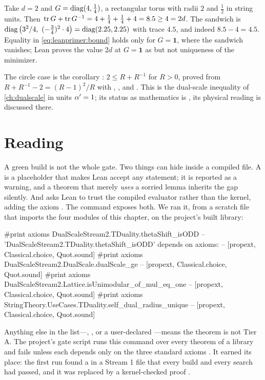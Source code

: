 \begin{example}[Numbers]\label{ex:leanprimer:numbers}
Take $d=2$ and $G=\operatorname{diag}(4,\tfrac14)$, a rectangular torus with radii $2$ and $\tfrac12$ in
string units. Then $\operatorname{tr} G+\operatorname{tr} G^{-1} = 4+\tfrac14+\tfrac14+4 = 8.5\ge4=2d$. The sandwich
is $\diag\big(3^2/4,\ (-\tfrac34)^2\cdot4\big)=\diag(2.25,2.25)$ with trace $4.5$, and
indeed $8.5-4=4.5$. Equality in \eqref{eq:leanprimer:bound} holds only for $G=\mathbf 1$,
where the sandwich vanishes; Lean proves the value $2d$ at $G=\mathbf 1$ as
 but not uniqueness of the minimizer.
\end{example}

The circle case is the corollary :
$2\le R+R^{-1}$ for $R>0$, proved from $R+R^{-1}-2=(R-1)^2/R$ with ,
,  and . This is the dual-scale inequality of
\cref{ch:dualscale} in units $\alpha'=1$; its status as mathematics is \TA, its physical
reading is discussed there.

\section{Reading }\label{sec:leanprimer:axioms}

A green build is not the whole gate. Two things can hide inside a compiled file. A
 is a
placeholder that makes Lean accept any statement; it is reported as a
warning, and a theorem that merely \emph{uses} a sorried lemma inherits the gap silently.
And  asks Lean to trust the compiled evaluator rather than the kernel,
adding the axiom . The command  exposes both.
We ran it, from a scratch file that imports the four modules of this chapter, on the
project's built library:
\begin{leancode}
#print axioms DualScaleStream2.TDuality.thetaShift_isODD
-- 'DualScaleStream2.TDuality.thetaShift_isODD' depends on axioms:
--   [propext, Classical.choice, Quot.sound]
#print axioms DualScaleStream2.DualScale.dualScale_ge
-- [propext, Classical.choice, Quot.sound]
#print axioms DualScaleStream2.Lattice.isUnimodular_of_mul_eq_one
-- [propext, Classical.choice, Quot.sound]
#print axioms StringTheory.UseCases.TDuality.self_dual_radius_unique
-- [propext, Classical.choice, Quot.sound]
\end{leancode}
Anything else in the list---, , or a user-declared
---means the theorem is not Tier A. The project's gate script
 runs this command over every theorem of a library and fails
unless each depends only on the three standard axioms
. It earned its place: the first run found a
 in a Stream 1 file that every build and every  search had
passed, and it was replaced by a kernel-checked  proof
.

